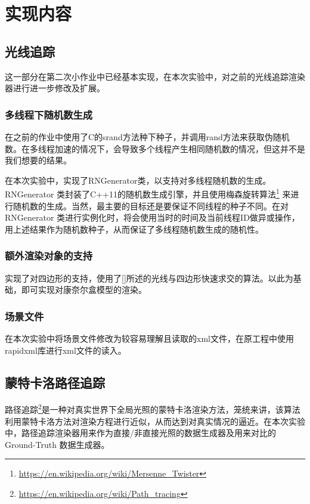 \section {实现内容}
\subsection {光线追踪}
这一部分在第二次小作业中已经基本实现，在本次实验中，对之前的光线追踪渲染器进行进一步修改及扩展。

\subsubsection {多线程下随机数生成}
在之前的作业中使用了C的srand方法种下种子，并调用rand方法来获取伪随机数。在多线程加速的情况下，会导致多个线程产生相同随机数的情况，但这并不是我们想要的结果。

在本次实验中，实现了RNGenerator类，以支持对多线程随机数的生成。RNGenerator 类封装了C++11的随机数生成引擎，并且使用梅森旋转算法\footnote{\url{https://en.wikipedia.org/wiki/Mersenne_Twister}} 来进行随机数的生成。当然，最主要的目标还是要保证不同线程的种子不同。在对RNGenerator 类进行实例化时，将会使用当时的时间及当前线程ID做异或操作，用上述结果作为随机数种子，从而保证了多线程随机数生成的随机性。

\subsubsection {额外渲染对象的支持}
实现了对四边形的支持，使用了[\cite{lagae2005efficient}]所述的光线与四边形快速求交的算法。以此为基础，即可实现对康奈尔盒模型的渲染。

\subsubsection {场景文件}
在本次实验中将场景文件修改为较容易理解且读取的xml文件，在原工程中使用rapidxml库进行xml文件的读入。

\subsection {蒙特卡洛路径追踪}
路径追踪\footnote{\url{https://en.wikipedia.org/wiki/Path_tracing}}是一种对真实世界下全局光照的蒙特卡洛渲染方法，笼统来讲，该算法利用蒙特卡洛方法对渲染方程进行近似，从而达到对真实情况的逼近。在本次实验中，路径追踪渲染器用来作为直接/非直接光照的数据生成器及用来对比的Ground-Truth 数据生成器。

